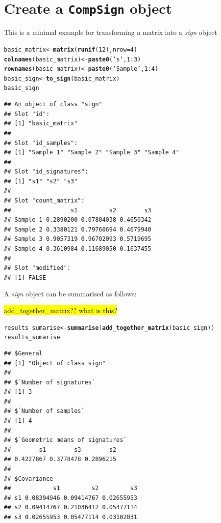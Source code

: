 \documentclass{article}\usepackage[]{graphicx}\usepackage[]{color}
\makeatletter
\newcommand{\hlnum}[1]{\textcolor[rgb]{0.686,0.059,0.569}{#1}}%
\newcommand{\hlstr}[1]{\textcolor[rgb]{0.192,0.494,0.8}{#1}}%
\newcommand{\hlopt}[1]{\textcolor[rgb]{0,0,0}{#1}}%
\newcommand{\hlstd}[1]{\textcolor[rgb]{0.345,0.345,0.345}{#1}}%
\newcommand{\hlkwb}[1]{\textcolor[rgb]{0.69,0.353,0.396}{#1}}%
\newcommand{\hlkwc}[1]{\textcolor[rgb]{0.333,0.667,0.333}{#1}}%
\newcommand{\hlkwd}[1]{\textcolor[rgb]{0.737,0.353,0.396}{\textbf{#1}}}%
\newenvironment{kframe}{%
 \def\at@end@of@kframe{}%
 \ifinner\ifhmode%
  \def\at@end@of@kframe{\end{minipage}}%
  \begin{minipage}{\columnwidth}%
 \fi\fi%
 \def\FrameCommand##1{\hskip\@totalleftmargin \hskip-\fboxsep
 \colorbox{shadecolor}{##1}\hskip-\fboxsep
     \hskip-\linewidth \hskip-\@totalleftmargin \hskip\columnwidth}%
 \MakeFramed {\advance\hsize-\width
   \@totalleftmargin\z@ \linewidth\hsize
   \@setminipage}}%
 {\par\unskip\endMakeFramed%
 \at@end@of@kframe}
\newenvironment{knitrout}{}{} %
\makeatother
\begin{document}
\section{Create a \texttt{CompSign} object}
This is a minimal example for transforming a matrix into a \emph{sign} object
\begin{knitrout}
\color{fgcolor}\begin{kframe}
\begin{alltt}
\hlstd{basic_matrix} \hlkwb{<-} \hlkwd{matrix}\hlstd{(}\hlkwd{runif}\hlstd{(}\hlnum{12}\hlstd{),} \hlkwc{nrow} \hlstd{=} \hlnum{4}\hlstd{)}
\hlkwd{colnames}\hlstd{(basic_matrix)} \hlkwb{<-} \hlkwd{paste0}\hlstd{(}\hlstr{'s'}\hlstd{,} \hlnum{1}\hlopt{:}\hlnum{3}\hlstd{)}
\hlkwd{rownames}\hlstd{(basic_matrix)} \hlkwb{<-} \hlkwd{paste0}\hlstd{(}\hlstr{'Sample '}\hlstd{,} \hlnum{1}\hlopt{:}\hlnum{4}\hlstd{)}
\hlstd{basic_sign} \hlkwb{<-} \hlkwd{to_sign}\hlstd{(basic_matrix)}
\hlstd{basic_sign}
\end{alltt}
\begin{verbatim}
## An object of class "sign"
## Slot "id":
## [1] "basic_matrix"
## 
## Slot "id_samples":
## [1] "Sample 1" "Sample 2" "Sample 3" "Sample 4"
## 
## Slot "id_signatures":
## [1] "s1" "s2" "s3"
## 
## Slot "count_matrix":
##                 s1         s2        s3
## Sample 1 0.2890200 0.07804038 0.4650342
## Sample 2 0.3380121 0.79760694 0.4679940
## Sample 3 0.9057319 0.96702093 0.5719695
## Sample 4 0.3610984 0.11689050 0.1637455
## 
## Slot "modified":
## [1] FALSE
\end{verbatim}
\end{kframe}
\end{knitrout}

A \emph{sign} object can be summarised as follows:

\hl{add\_together\_matrix?? what is this?}

\begin{knitrout}
\color{fgcolor}\begin{kframe}
\begin{alltt}
\hlstd{results_sumarise} \hlkwb{<-} \hlkwd{summarise}\hlstd{(}\hlkwd{add_together_matrix}\hlstd{(basic_sign))}
\hlstd{results_sumarise}
\end{alltt}
\begin{verbatim}
## $General
## [1] "Object of class sign"
## 
## $`Number of signatures`
## [1] 3
## 
## $`Number of samples`
## [1] 4
## 
## $`Geometric means of signatures`
##        s1        s3        s2 
## 0.4227867 0.3778478 0.2896215 
## 
## $Covariance
##            s1         s2         s3
## s1 0.08394946 0.09414767 0.02655953
## s2 0.09414767 0.21036412 0.05477114
## s3 0.02655953 0.05477114 0.03102031
\end{verbatim}
\end{kframe}
\end{knitrout}
\end{document}
